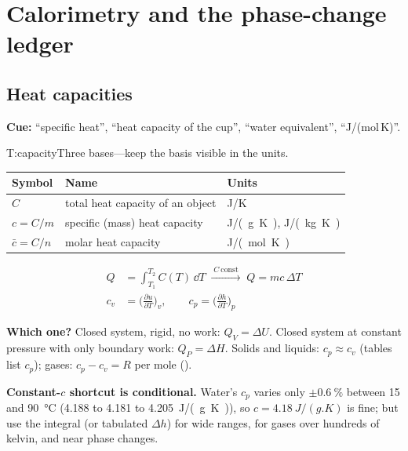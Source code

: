 \section{Calorimetry and the phase-change ledger}\label{sec:calor}
\begin{multicols}{2}
\subsection{Heat capacities}\label{sec:heatcap}
\CORE{} \textbf{Cue:} ``specific heat'', ``heat capacity of the cup'', ``water equivalent'', ``J/(mol\,K)''.

\begin{reftab}{T:capacity}{Three bases---keep the basis visible in the units.}
\small
\begin{tabularx}{\linewidth}{@{}lYl@{}}
\toprule
Symbol & Name & Units\\
\midrule
$C$ & total heat capacity of an object & \si{J/K}\\
$c=C/m$ & specific (mass) heat capacity & \si{J/(g.K)}, \si{J/(kg.K)}\\
$\bar c = C/n$ & molar heat capacity & \si{J/(mol.K)}\\
\bottomrule
\end{tabularx}\end{reftab}

\begin{formulabox}
\vspace{-6pt}
\begin{align}
Q &= \int_{T_1}^{T_2} C(T)\,\dd T \;\xrightarrow{\;C\ \text{const}\;}\; Q = mc\,\Delta T \label{F:cal:sensible}\\
c_v &= \Big(\frac{\partial u}{\partial T}\Big)_{\!v},\qquad c_p=\Big(\frac{\partial h}{\partial T}\Big)_{\!p} \label{F:cal:cvcp}
\end{align}
\end{formulabox}
\textbf{Which one?} Closed system, rigid, no work: $Q_V=\Delta U$. Closed system at constant pressure with only boundary work: $Q_P=\Delta H$. Solids and liquids: $c_p\approx c_v$ (tables list $c_p$); gases: $c_p-c_v=R$ per mole ().

\textbf{Constant-$c$ shortcut is conditional.} Water's $c_p$ varies only $\pm\SI{0.6}{\percent}$ between 15 and \SI{90}{\celsius} (4.188 to 4.181 to \SI{4.205}{J/(g.K)}), so $c=\SI{4.18}{J/(g.K)}$ is fine; but use the integral (or tabulated $\Delta h$) for wide ranges, for gases over hundreds of kelvin, and near phase changes.


\end{multicols}
